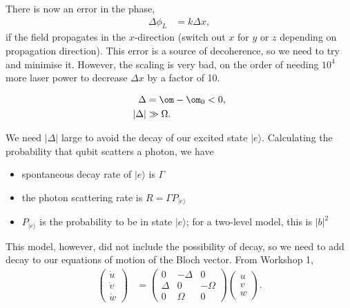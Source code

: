 \documentclass[a4paper, 11pt, normalem]{report}
\begin{document}
There is now an error in the phase,
\begin{align}
    \Delta\phi_L &= k\Delta x,
\end{align}
if the field propagates in the $x$-direction (switch out $x$ for $y$ or $z$ depending on propagation direction).
This error is a source of decoherence, so we need to try and minimise it.
However, the scaling is very bad, on the order of needing $10^4$ more laser power to decrease $\Delta x$ by a factor of 10.
\begin{figure}[H]
    \begin{multicols}{2}
    \centering
    \columnbreak
    \vspace*{\fill}
    \begin{align}
        \Delta &= \om-\om_0 < 0, \\
        |\Delta| &\gg \Omega.
    \end{align}
    \vspace*{\fill}
    \end{multicols}
    \vspace{-40pt}
\end{figure}
We need $|\Delta|$ large to avoid the decay of our excited state $|e\rangle$.
Calculating the probability that qubit scatters a photon, we have
\begin{itemize}
    \item spontaneous decay rate of $|e\rangle$ is $\Gamma$
    \item the photon scattering rate is $R=\Gamma P_{|e\rangle}$
    \item $P_{|e\rangle}$ is the probability to be in state $|e\rangle$; for a two-level model, this is $|b|^2$
\end{itemize}
This model, however, did not include the possibility of decay, so we need to add decay to our equations of motion of the Bloch vector.
From Workshop 1,
\begin{align}
    \begin{pmatrix} \dot u \\ \dot v \\ \dot w \end{pmatrix} &= \begin{pmatrix} 0 &-\Delta &0\\ \Delta & 0 & -\Omega \\ 0 & \Omega & 0 \end{pmatrix}\begin{pmatrix}u \\ v \\ w\end{pmatrix}.
\end{align}
\end{document}
